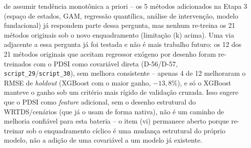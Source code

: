 de assumir tendência monotônica a priori -- os 5 métodos adicionados na Etapa 3 (espaço de estados, GAM, regressão quantílica, análise de intervenção, modelo fundacional) já respondem parte dessa pergunta, mas nenhum re-treina os 21 métodos originais sob o novo enquadramento (limitação (k) acima). Uma via adjacente a essa pergunta já foi testada e não é mais trabalho futuro: os 12 dos 21 métodos originais que aceitam regressor exógeno por desenho foram re-treinados com o PDSI como covariável direta (D-56/D-57, \texttt{script\_29}/\texttt{script\_30}), sem melhora consistente -- apenas 4 de 12 melhoraram o RMSE de \textit{holdout} (XGBoost com o maior ganho, $-13{,}8\%$), e só o XGBoost manteve o ganho sob um critério mais rígido de validação cruzada. Isso sugere que o PDSI como \textit{feature} adicional, sem o desenho estrutural do WRTDS/cenários (que já o usam de forma nativa), não é um caminho de melhoria confiável para esta bateria -- o item (vi) permanece aberto porque re-treinar sob o enquadramento cíclico é uma mudança estrutural do próprio modelo, não a adição de uma covariável a um modelo já existente.
